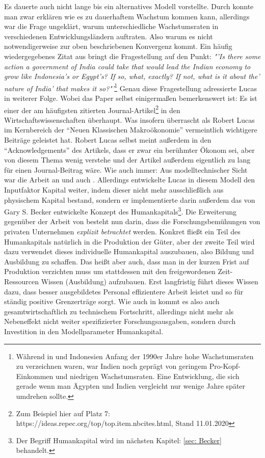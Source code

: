 Es dauerte auch nicht lange bis \textcite{Lucas1988} ein alternatives Modell vorstellte. Durch \textcite{Romer1986} konnte man zwar erklären wie es zu dauerhaftem Wachstum kommen kann, allerdings war die Frage ungeklärt, warum unterschiedliche Wachstumsraten in verschiedenen Entwicklungsländern auftraten. Also warum es nicht notwendigerweise zur oben beschriebenen Konvergenz kommt. Ein häufig wiedergegebenes Zitat aus \textcite[S. 5]{Lucas1988} bringt die Fragestellung auf den Punkt: \textit{"'Is there some action a government of India could take that would lead the Indian economy to grow like Indonesia's or Egypt's? If so, what, exactly? If not, what is it about the' nature of India' that makes it	so?"'}\footnote{Während in  und Indonesien Anfang der 1990er Jahre hohe Wachstumsraten zu verzeichnen waren, war Indien noch geprägt von geringem Pro-Kopf-Einkommen und niedrigen Wachstumsraten. Eine Entwicklung, die sich gerade wenn man Ägypten und Indien vergleicht nur wenige Jahre später umdrehen sollte.} Genau diese Fragestellung adressierte Lucas in weiterer Folge. Wobei das Paper selbst einigermaßen bemerkenswert ist: Es ist einer der am häufigsten zitierten Journal-Artikel\footnote{Zum Beispiel hier auf Platz 7: https://ideas.repec.org/top/top.item.nbcites.html, Stand 11.01.2020} in den Wirtschaftswissenschaften überhaupt. Was insofern überrascht als Robert Lucas im Kernbereich der "`Neuen Klassischen Makroökonomie"' vermeintlich wichtigere Beiträge geleistet hat. Robert Lucas selbst meint außerdem in den "`Acknowledgements"' \parencite[S. 41]{Lucas1988} des Artikels, dass er zwar ein berühmter Ökonom sei, aber von diesem Thema wenig verstehe und der Artikel außerdem eigentlich zu lang für einen Journal-Beitrag wäre.
Wie auch immer: Aus modelltechnischer Sicht war die Arbeit an \parencite{Uzawa1965} und auch \parencite{Romer1986}. Allerdings entwickelte Lucas in diesem Modell den Inputfaktor Kapital weiter, indem dieser nicht mehr ausschließlich aus physischem Kapital bestand, sondern er implementierte darin außerdem das von Gary S. Becker entwickelte Konzept des Humankapitals\footnote{Der Begriff Humankapital wird im nächsten Kapitel: \ref{sec: Becker} behandelt.}.
Die Erweiterung gegenüber der Arbeit von \textcite{Romer1986} besteht nun darin, dass die Forschungsbemühungen von privaten Unternehmen \textit{explizit betrachtet} werden. Konkret fließt ein Teil des Humankapitals natürlich in die Produktion der Güter, aber der zweite Teil wird dazu verwendet dieses individuelle Humankapital auszubauen, also Bildung und Ausbildung zu schaffen. Das heißt aber auch, dass man in der kurzen Frist auf Produktion verzichten muss um stattdessen mit den freigewordenen Zeit-Ressourcen Wissen (Ausbildung) aufzubauen. Erst langfristig führt dieses Wissen dazu, dass besser ausgebildetes Personal effizientere Arbeit leistet und so für ständig positive Grenzerträge sorgt. Wie auch in \textcite{Romer1986} kommt es also auch gesamtwirtschaftlich zu technischem Fortschritt, allerdings nicht mehr als Nebeneffekt nicht weiter spezifizierter Forschungsausgaben, sondern durch Investition in den Modellparameter Humankapital.

